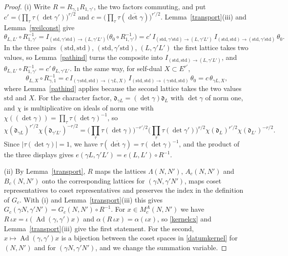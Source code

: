 \begin{proof}
(i) Write $R=R_{\gamma,1}R_{1,\gamma'}$, the two factors commuting, and put $c'=\big(\prod_\tau\tau(\det\gamma')\big)^{r/2}$ and $c=\big(\prod_\tau\tau(\overline{\det\gamma})\big)^{r'/2}$. Lemma~\ref{transport}(iii) and Lemma~\ref{weilconst} give
\[
\theta_{L,L'}\circ R_{1,\gamma'}^{-1}=I_{(\mathrm{std},\gamma'\mathrm{std})\to(L,\gamma'L')}\big(\theta_0\circ R_{1,\gamma'}^{-1}\big)=c'\,I_{(\mathrm{std},\gamma'\mathrm{std})\to(L,\gamma'L')}\,I_{(\mathrm{std},\mathrm{std})\to(\mathrm{std},\gamma'\mathrm{std})}\,\theta_0 .
\]
In the three pairs $(\mathrm{std},\mathrm{std})$, $(\mathrm{std},\gamma'\mathrm{std})$, $(L,\gamma'L')$ the first lattice takes two values, so Lemma~\ref{pathind} turns the composite into $I_{(\mathrm{std},\mathrm{std})\to(L,\gamma'L')}$, and $\theta_{L,L'}\circ R_{1,\gamma'}^{-1}=c'\,\theta_{L,\gamma'L'}$. In the same way, for self-dual $X\subset E^{r'}$,
\[
\theta_{L,X}\circ R_{\gamma,1}^{-1}=c\,I_{(\gamma\,\mathrm{std},\mathrm{std})\to(\gamma L,X)}\,I_{(\mathrm{std},\mathrm{std})\to(\gamma\,\mathrm{std},\mathrm{std})}\,\theta_0=c\,\theta_{\gamma L,X},
\]
where Lemma~\ref{pathind} applies because the second lattice takes the two values $\mathrm{std}$ and $X$.
For the character factor, $\mathfrak d_{\gamma L}=(\det\gamma)\mathfrak d_L$ with $\det\gamma$ of norm one, and $\chi$ is multiplicative on ideals of norm one with $\chi((\det\gamma))=\prod_\tau\tau(\det\gamma)^{-1}$, so
\[
\chi(\mathfrak d_{\gamma L})^{r'/2}\chi(\mathfrak d_{\gamma'L'})^{-r/2}=\Big(\prod_\tau\tau(\det\gamma)\Big)^{-r'/2}\Big(\prod_\tau\tau(\det\gamma')\Big)^{r/2}\chi(\mathfrak d_L)^{r'/2}\chi(\mathfrak d_{L'})^{-r/2}.
\]
Since $\lvert\tau(\det\gamma)\rvert=1$, we have $\tau(\overline{\det\gamma})=\tau(\det\gamma)^{-1}$, and the product of the three displays gives $e(\gamma L,\gamma'L')=e(L,L')\circ R^{-1}$.

(ii) By Lemma~\ref{transport}, $R$ maps the lattices $\Lambda(N,N')$, $A_c(N,N')$ and $B_c(N,N')$ onto the corresponding lattices for $(\gamma N,\gamma'N')$, maps coset representatives to coset representatives and preserves the index in the definition of $G_c$. With (i) and Lemma~\ref{transport}(iii) this gives $G_c(\gamma N,\gamma'N')=G_c(N,N')\circ R^{-1}$. For $x\in M^A_c(N,N')$ we have $R\,\iota x=\iota(\operatorname{Ad}(\gamma,\gamma')x)$ and $\alpha(R\,\iota x)=\alpha(\iota x)$, so \eqref{kernelcx} and Lemma~\ref{transport}(iii) give the first statement. For the second, $x\mapsto\operatorname{Ad}(\gamma,\gamma')x$ is a bijection between the coset spaces in \eqref{datumkernel} for $(N,N')$ and for $(\gamma N,\gamma'N')$, and we change the summation variable.


\end{proof}
